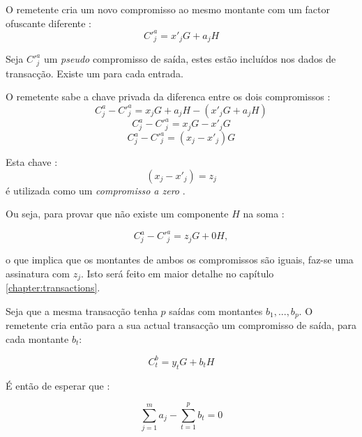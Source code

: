 O remetente cria um novo compromisso ao mesmo montante com um factor ofuscante diferente :   
\[C'^a_{j} = x'_j G + a_j H\]

Seja $C'^a_j$ um {\em pseudo} compromisso de saída, estes estão incluídos nos dados de transacção. Existe um para cada entrada. 

O remetente sabe a chave privada da diferenca entre os dois compromissos :
\[C^a_{j} - C'^a_{j} = x_j G + a_j H - ( x'_j G + a_j H )\]
\[C^a_{j} - C'^a_{j} = x_j G - x'_j G\]
\[C^a_{j} - C'^a_{j} = (x_j - x'_j) G\]

Esta chave : 
\[(x_j - x'_j) = z_j\]
é utilizada como um {\em compromisso a zero }.\newline

Ou seja, para provar que não existe um componente $H$ na soma : 

\[C^a_{j} - C'^a_{j} = z_j G + 0H ,\]

o que implica que os montantes de ambos os compromissos são iguais, faz-se uma assinatura com $z_j$. Isto será feito em maior detalhe no capítulo \ref{chapter:transactions}. 



Seja que a mesma transacção tenha $p$ saídas com montantes \(b_1, ..., b_p\).
O remetente cria então para a sua actual transacção um compromisso de saída, para cada montante $b_t$:
  
\[C^b_{t} = y_t G + b_t H \]

É então de esperar que :

\[\sum_{j=1}^{m} a_j - \sum_{t=1}^{p} b_t = 0\]


